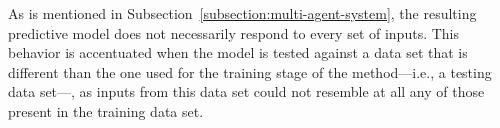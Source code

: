 ﻿\documentclass{ieeeaccess}
\begin{document}
As is mentioned in Subsection~\ref{subsection:multi-agent-system}, the
resulting predictive model does not necessarily respond to every set of
inputs. This behavior is accentuated when the model is tested against a data
set that is different than the one used for the training stage of the
method---i.e., a testing data set---, as inputs from this data set could not
resemble at all any of those present in the training data set. %




\end{document}
